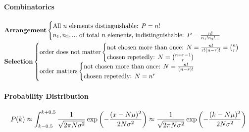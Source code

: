 \paragraph{Combinatorics}
\tiny
\begin{align*}
    &\text{\textbf{Arrangement}}
    \begin{cases}
        \text{All $n$ elements distinguishable: } P = n!
        \\
        \text{$n_1 , n_2,...$ of total $n$ elements, indistinguishable: }
        P = \frac{n!}{n_1 ! n_2 ! \dots}
    \end{cases}
    \\
    &\text{\textbf{Selection}}
    \begin{cases}
        \text{order does not matter}
        \begin{cases}
            \text{not chosen more than once: } N = \frac{n!}{r! (n-r)!} = \binom{n}{r}
            \\
            \text{chosen repetedly: } N = \binom{n+r-1}{r}
        \end{cases}
        \\
        \text{order matters}
        \begin{cases}
            \text{not chosen more than once: } N = \frac{n!}{(n-r)!}
            \\
            \text{chosen repetedly: } N = n^r
        \end{cases}
    \end{cases}
\end{align*}

\paragraph{Probability Distribution}
\footnotesize
\begin{align*}
    P(k) \approx \int_{k-0.5}^{k+0.5} \frac{1}{\sqrt{2 \pi N \sigma^2}}
        \exp \left( - \frac{(x-N \mu)^2}{2 N \sigma^2} \right)
    \approx
    \frac{1}{\sqrt{2 \pi N \sigma^2}}
        \exp \left( - \frac{(k-N \mu)^2}{2 N \sigma^2} \right)
\end{align*}

\normalsize

